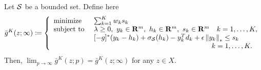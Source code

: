 \begin{theorem}
  Let $\mathcal{S}$ be a bounded set.
  Define here
  \begin{equation}
    \label{eq:def:barf}
    \bar g^K(z;\infty)\defn
    \left\{
      \begin{array}{l@{~~~~}l}
				\mbox{\rm{minimize}} & \sum_{k=1}^K w_k s_k\\
        \mbox{\rm{subject to}} &  \lambda \geq 0,~ y_{k}\in \Re^m, ~h_{k}\in \Re^m, ~s_k\in \Re^m \quad k=1,\dots, K,\\
             &  [-g]^*(y_{k} - h_{k}) + \sigma_{\supp}(h_{k}) - y_{k}^T{d}_k  + \epsilon \left\|y_{k} \right\|_* \le s_k\\
						 &\hspace{5.5cm} \quad k=1,\dots, K.
      \end{array}
    \right.
  \end{equation}
  Then,
  \(
    \lim_{p\to \infty} \bar g^K(z;p)= \bar g^K(z;\infty)
  \)
  for any $z\in X$.
\end{theorem}
